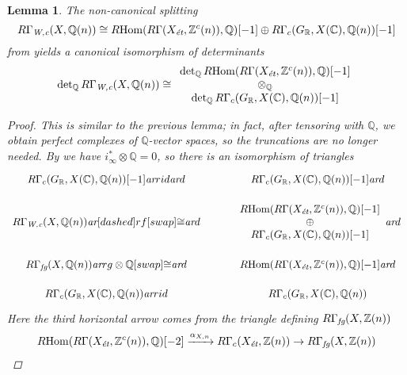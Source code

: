 \documentclass[10pt,a4paper,oneside,draft]{article}
\DeclareMathOperator{\Hom}{Hom}
\newcommand{\CC}{\mathbb{C}}
\newcommand{\QQ}{\mathbb{Q}}
\newcommand{\RR}{\mathbb{R}}
\newcommand{\ZZ}{\mathbb{Z}}
\renewcommand{\det}{\operatorname{det}}
\newcommand{\ar}{\text{\it ar}}
\newcommand{\et}{\text{\it \'{e}t}}
\newcommand{\fg}{\text{\it fg}}
\newcommand{\Wc}{\text{\it W,c}}
\newcommand{\RHom}{R\!\Hom}
\theoremstyle{myplain}
\newtheorem{lemma}[theorem]{Lemma}
\theoremstyle{mydefinition}
\numberwithin{equation}{section}
\begin{document}
\begin{lemma}
  The non-canonical splitting
  \[ R\Gamma_\Wc (X, \QQ(n)) \cong
    \RHom (R\Gamma (X_\et, \ZZ^c (n)), \QQ) [-1] \oplus
    R\Gamma_c (G_\RR, X (\CC), \QQ (n)) [-1] \]
  from \cite[Proposition~7.13]{Beshenov-Weil-etale-1} yields a canonical
  isomorphism of determinants
  \[ \det_\QQ R\Gamma_\Wc (X, \QQ(n)) \cong
    \begin{array}{c}
      \det_\QQ \RHom (R\Gamma (X_\et, \ZZ^c (n)), \QQ) [-1] \\
      \otimes_\QQ \\
      \det_\QQ R\Gamma_c (G_\RR, X (\CC), \QQ (n)) [-1]
    \end{array} \]

  \begin{proof}
    This is similar to the previous lemma; in fact, after tensoring with $\QQ$,
    we obtain perfect complexes of $\QQ$-vector spaces, so the truncations are
    no longer needed. By \cite[Proposition~7.4]{Beshenov-Weil-etale-1} we have
    $i_\infty^* \otimes \QQ = 0$, so there is an isomorphism of triangles
    \begin{equation}
      \label{eqn:splitting-of-RGamma-Wc-triangles}
      \begin{tikzcd}[row sep=1em]
        R\Gamma_c (G_\RR, X (\CC), \QQ (n)) [-1] \ar{r}{id}\ar{d} & R\Gamma_c (G_\RR, X (\CC), \QQ (n)) [-1]\ar{d} \\
        R\Gamma_\Wc (X, \QQ(n)) \ar[dashed]{r}{f}[swap]{\cong}\ar{d} & \begin{array}{c} \RHom (R\Gamma (X_\et, \ZZ^c (n)), \QQ) [-1] \\ \oplus \\ R\Gamma_c (G_\RR, X (\CC), \QQ (n)) [-1] \end{array}\ar{d} \\
        R\Gamma_\fg (X, \QQ(n)) \ar{r}{g\otimes \QQ}[swap]{\cong}\ar{d} & \RHom (R\Gamma (X_\et, \ZZ^c (n)), \QQ) [-1] \ar{d} \\
        R\Gamma_c (G_\RR, X (\CC), \QQ (n)) \ar{r}{id} & R\Gamma_c (G_\RR, X (\CC), \QQ (n))
      \end{tikzcd}
    \end{equation}
    Here the third horizontal arrow comes from the triangle defining
    $R\Gamma_\fg (X, \ZZ(n))$
    \begin{multline*}
      \RHom (R\Gamma (X_\et, \ZZ^c (n)), \QQ) [-2] \xrightarrow{\alpha_{X,n}}
      R\Gamma_c (X_\et, \ZZ (n)) \to
      R\Gamma_\fg (X, \ZZ(n)) \\

\end{multline*}
\end{proof}
\end{lemma}
\end{document}
